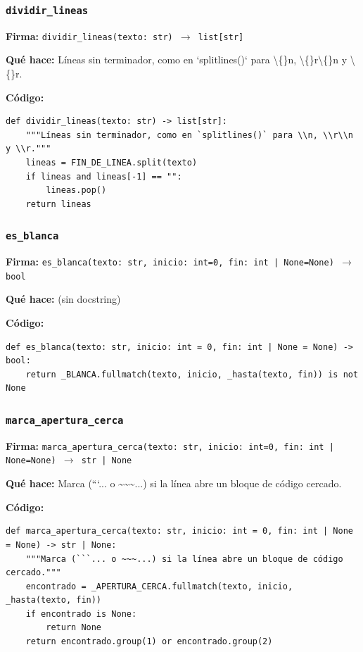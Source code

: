 \documentclass[11pt,a4paper]{article}
\begin{document}
\subsubsection*{\texttt{dividir\_lineas}}
\textbf{Firma:} \texttt{dividir\_lineas(texto: str) $\rightarrow$ list[str]}

\textbf{Qué hace:} Líneas sin terminador, como en `splitlines()` para \textbackslash\{\}n, \textbackslash\{\}r\textbackslash\{\}n y \textbackslash\{\}r.

\textbf{Código:}
\begin{lstlisting}
def dividir_lineas(texto: str) -> list[str]:
    """Líneas sin terminador, como en `splitlines()` para \\n, \\r\\n y \\r."""
    lineas = FIN_DE_LINEA.split(texto)
    if lineas and lineas[-1] == "":
        lineas.pop()
    return lineas
\end{lstlisting}

\subsubsection*{\texttt{es\_blanca}}
\textbf{Firma:} \texttt{es\_blanca(texto: str, inicio: int=0, fin: int | None=None) $\rightarrow$ bool}

\textbf{Qué hace:} (sin docstring)

\textbf{Código:}
\begin{lstlisting}
def es_blanca(texto: str, inicio: int = 0, fin: int | None = None) -> bool:
    return _BLANCA.fullmatch(texto, inicio, _hasta(texto, fin)) is not None
\end{lstlisting}

\subsubsection*{\texttt{marca\_apertura\_cerca}}
\textbf{Firma:} \texttt{marca\_apertura\_cerca(texto: str, inicio: int=0, fin: int | None=None) $\rightarrow$ str | None}

\textbf{Qué hace:} Marca (```... o \textasciitilde{}\textasciitilde{}\textasciitilde{}...) si la línea abre un bloque de código cercado.

\textbf{Código:}
\begin{lstlisting}
def marca_apertura_cerca(texto: str, inicio: int = 0, fin: int | None = None) -> str | None:
    """Marca (```... o ~~~...) si la línea abre un bloque de código cercado."""
    encontrado = _APERTURA_CERCA.fullmatch(texto, inicio, _hasta(texto, fin))
    if encontrado is None:
        return None
    return encontrado.group(1) or encontrado.group(2)
\end{lstlisting}
\end{document}
